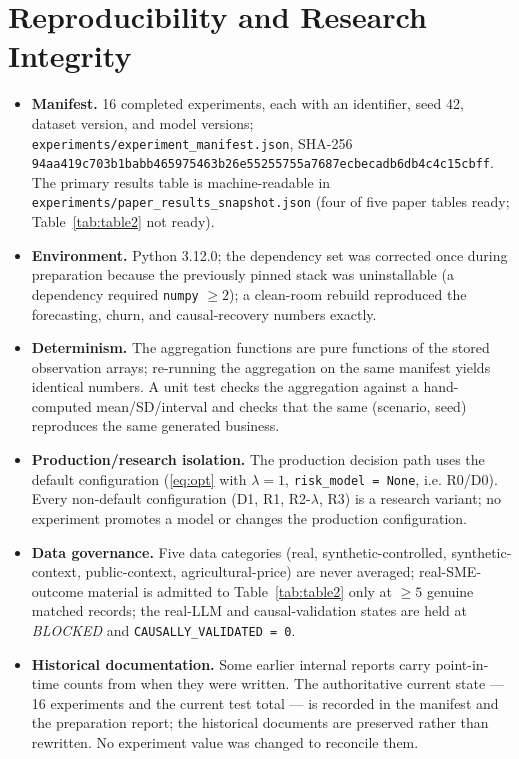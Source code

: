 \documentclass[conference]{IEEEtran}
\newcommand{\code}[1]{\texttt{#1}}
\begin{document}
\section{Reproducibility and Research Integrity}
\label{sec:repro}

\begin{itemize}
\item \textbf{Manifest.} 16 completed experiments, each with an identifier, seed
42, dataset version, and model versions;
\code{experiments/experiment\_manifest.json}, SHA-256
\code{94aa419c703b1babb465975463b26e55255755a7687ecbecadb6db4c4c15cbff}. The
primary results table is machine-readable in
\code{experiments/paper\_results\_snapshot.json} (four of five paper tables
ready; Table~\ref{tab:table2} not ready).
\item \textbf{Environment.} Python 3.12.0; the dependency set was corrected once
during preparation because the previously pinned stack was uninstallable (a
dependency required \code{numpy} $\geq 2$); a clean-room rebuild reproduced the
forecasting, churn, and causal-recovery numbers exactly.
\item \textbf{Determinism.} The aggregation functions are pure functions of the
stored observation arrays; re-running the aggregation on the same manifest
yields identical numbers. A unit test checks the aggregation against a
hand-computed mean/SD/interval and checks that the same (scenario, seed)
reproduces the same generated business.
\item \textbf{Production/research isolation.} The production decision path uses
the default configuration (\eqref{eq:opt} with $\lambda = 1$,
\code{risk\_model = None}, i.e. R0/D0). Every non-default configuration (D1, R1,
R2-$\lambda$, R3) is a research variant; no experiment promotes a model or
changes the production configuration.
\item \textbf{Data governance.} Five data categories (real,
synthetic-controlled, synthetic-context, public-context, agricultural-price) are
never averaged; real-SME-outcome material is admitted to Table~\ref{tab:table2}
only at $\geq 5$ genuine matched records; the real-LLM and causal-validation
states are held at \emph{BLOCKED} and \code{CAUSALLY\_VALIDATED = 0}.
\item \textbf{Historical documentation.} Some earlier internal reports carry
point-in-time counts from when they were written. The authoritative current
state --- 16 experiments and the current test total --- is recorded in the
manifest and the preparation report; the historical documents are preserved
rather than rewritten. No experiment value was changed to reconcile them.
\end{itemize}
\end{document}
